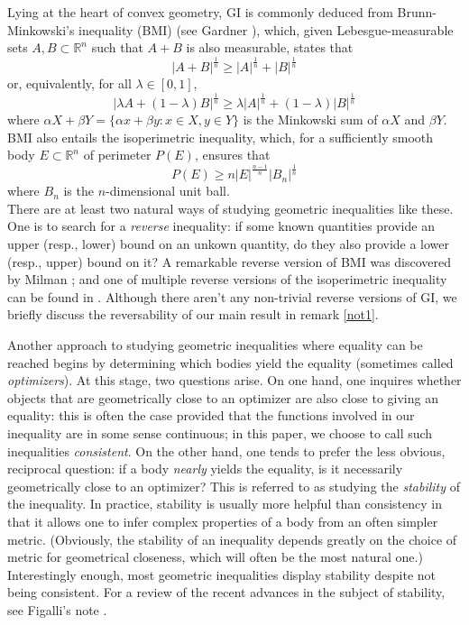 \documentclass[12pt,reqno]{amsart}
\theoremstyle{plain}
\theoremstyle{definition}
\theoremstyle{remark}
\numberwithin{equation}{section}
\begin{document}
Lying at the heart of convex geometry, GI is commonly deduced from Brunn-Minkowski's inequality (BMI) (see Gardner \cite{BM1}), which, given Lebesgue-measurable sets $A,B\subset \mathbb{R}^n$ such that $A+B$ is also measurable, states that $$|A+B|^{\frac 1 n}\geq |A|^{\frac 1 n}+|B|^{\frac 1 n}$$or, equivalently, for all $\lambda\in [0,1]$,
\begin{equation}\label{grun}
    |\lambda A+(1-\lambda)B|^{\frac 1 n}\geq \lambda |A|^{\frac 1 n}+(1-\lambda)|B|^{\frac 1 n}
\end{equation}
where $\alpha X+\beta Y=\{\alpha x+\beta y:x\in X,y\in Y\}$ is the Minkowski sum of $\alpha X$ and $\beta Y$. BMI also entails the isoperimetric inequality, which, for a sufficiently smooth body $E\subset \mathbb{R}^n$ of perimeter $P(E)$, ensures that
$$P(E)\geq n|E|^\frac{n-1}{n}|B_n|^{\frac 1 n}$$
where $B_n$ is the $n$-dimensional unit ball.
\\

There are at least two natural ways of studying geometric inequalities like these. One is to search for a \textit{reverse} inequality: if some known quantities provide an upper (resp., lower) bound on an unkown quantity, do they also provide a lower (resp., upper) bound on it? A remarkable reverse version of BMI was discovered by Milman \cite{MM}; and one of multiple reverse versions of the isoperimetric inequality can be found in \cite{BB}. Although there aren't any non-trivial reverse versions of GI, we briefly discuss the reversability of our main result in remark \ref{not1}.

Another approach to studying geometric inequalities where equality can be reached begins by determining which bodies yield the equality (sometimes called \textit{optimizers}). At this stage, two questions arise. On one hand, one inquires whether objects that are geometrically close to an optimizer are also close to giving an equality: this is often the case provided that the functions involved in our inequality are in some sense continuous; in this paper, we choose to call such inequalities \textit{consistent}. On the other hand, one tends to prefer the less obvious, reciprocal question: if a body \textit{nearly} yields the equality, is it necessarily geometrically close to an optimizer? This is referred to as studying the \textit{stability} of the inequality. In practice, stability is usually more helpful than consistency in that it allows one to infer complex properties of a body from an often simpler metric. (Obviously, the stability of an inequality depends greatly on the choice of metric for geometrical closeness, which will often be the most natural one.) Interestingly enough, most geometric inequalities display stability despite not being consistent. For a review of the recent advances in the subject of stability, see Figalli's note \cite{Fig1}.
\end{document}
